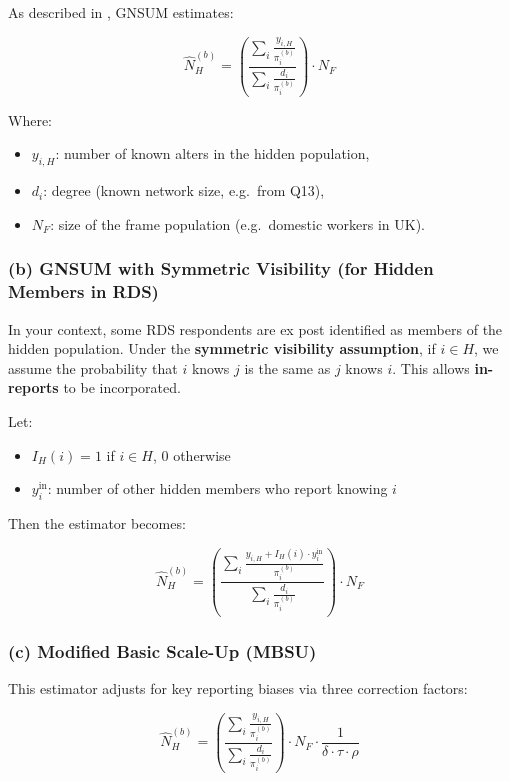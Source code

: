 \documentclass[
  12pt,
  letterpaper,
  DIV=11,
  numbers=noendperiod]{scrartcl}
\theoremstyle{plain}
\theoremstyle{definition}
\begin{document}
As described in \textcite{feeh16-generaling}, GNSUM estimates:

\[\hat{N}_H^{(b)} = \left( \frac{\sum_{i} \frac{y_{i,H}}{\pi_i^{(b)}}}{\sum_{i} \frac{d_i}{\pi_i^{(b)}}} \right) \cdot N_F\]

Where:

\begin{itemize}
\item
  \(y_{i,H}\): number of known alters in the hidden population,
\item
  \(d_i\): degree (known network size, e.g.~from Q13),
\item
  \(N_F\): size of the frame population (e.g.~domestic workers in UK).
\end{itemize}

\subsubsection{(b) GNSUM with Symmetric Visibility (for Hidden Members
in
RDS)}\label{b-gnsum-with-symmetric-visibility-for-hidden-members-in-rds}

In your context, some RDS respondents are ex post identified as members
of the hidden population. Under the \textbf{symmetric visibility
assumption}, if \(i \in H\), we assume the probability that \(i\) knows
\(j\) is the same as \(j\) knows \(i\). This allows \textbf{in-reports}
to be incorporated.

Let:

\begin{itemize}
\item
  \(I_H(i) = 1\) if \(i \in H\), 0 otherwise
\item
  \(y_{i}^{\text{in}}\): number of other hidden members who report
  knowing \(i\)
\end{itemize}

Then the estimator becomes:

\[\hat{N}_H^{(b)} = \left( \frac{\sum_{i} \frac{y_{i,H} + I_H(i) \cdot y_{i}^{\text{in}}}{\pi_i^{(b)}}}{\sum_{i} \frac{d_i}{\pi_i^{(b)}}} \right) \cdot N_F\]

\subsubsection{(c) Modified Basic Scale-Up
(MBSU)}\label{c-modified-basic-scale-up-mbsu}

This estimator adjusts for key reporting biases via three correction
factors:

\[\hat{N}_H^{(b)} = \left( \frac{\sum_{i} \frac{y_{i,H}}{\pi_i^{(b)}}}{\sum_{i} \frac{d_i}{\pi_i^{(b)}}} \right) \cdot N_F \cdot \frac{1}{\delta \cdot \tau \cdot \rho}\]
\end{document}

